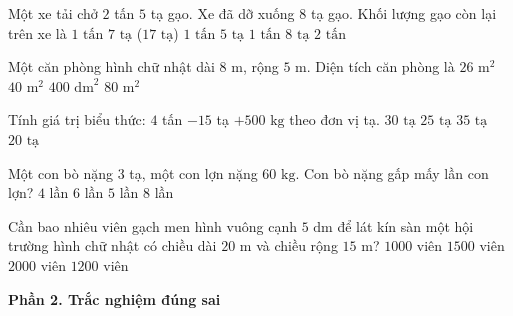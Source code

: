 \begin{ex} %
Một xe tải chở $2$ tấn $5$ tạ gạo. Xe đã dỡ xuống $8$ tạ gạo. Khối lượng gạo còn lại trên xe là
\choice
{\True $1\text{ tấn } 7\text{ tạ}$ ($17\text{ tạ}$)}
{$1\text{ tấn } 5\text{ tạ}$}
{$1\text{ tấn } 8\text{ tạ}$}
{$2\text{ tấn}$}
\end{ex}

\begin{ex} %
Một căn phòng hình chữ nhật dài $8\text{ m}$, rộng $5\text{ m}$. Diện tích căn phòng là
\choice
{$26\text{ m}^2$}
{\True $40\text{ m}^2$}
{$400\text{ dm}^2$}
{$80\text{ m}^2$}
\end{ex}

\begin{ex} %
Tính giá trị biểu thức: $4$ tấn $- 15$ tạ $+ 500\text{ kg}$ theo đơn vị tạ.
\choice
{\True $30\text{ tạ}$}
{$25\text{ tạ}$}
{$35\text{ tạ}$}
{$20\text{ tạ}$}
\end{ex}

\begin{ex} %
Một con bò nặng $3$ tạ, một con lợn nặng $60\text{ kg}$. Con bò nặng gấp mấy lần con lợn?
\choice
{$4$ lần}
{$6$ lần}
{\True $5$ lần}
{$8$ lần}
\end{ex}

\begin{ex} %
Cần bao nhiêu viên gạch men hình vuông cạnh $5\text{ dm}$ để lát kín sàn một hội trường hình chữ nhật có chiều dài $20\text{ m}$ và chiều rộng $15\text{ m}$?
\choice
{$1000$ viên}
{$1500$ viên}
{$2000$ viên}
{\True $1200$ viên}
\end{ex}

\textbf{Phần 2. Trắc nghiệm đúng sai}

